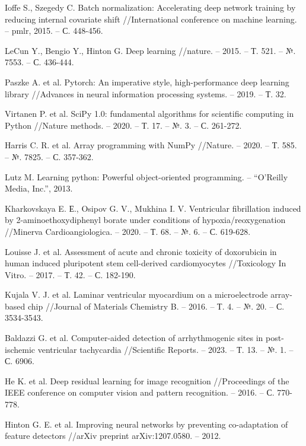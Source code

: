 \begin{thebibliography}{00}
	Ioffe S., Szegedy C. Batch normalization: Accelerating deep network
	training by reducing internal covariate shift //International conference on
	machine learning. – pmlr, 2015. – С. 448-456.

	LeCun Y., Bengio Y., Hinton G. Deep learning //nature. – 2015. – Т. 521. –
	№. 7553. – С. 436-444.

	Paszke A. et al. Pytorch: An imperative style, high-performance deep
	learning library //Advances in neural information processing systems. –
	2019. – Т. 32.

	Virtanen P. et al. SciPy 1.0: fundamental algorithms for scientific
	computing in Python //Nature methods. – 2020. – Т. 17. – №. 3. – С.
	261-272.

	Harris C. R. et al. Array programming with NumPy //Nature. – 2020. – Т.
	585. – №. 7825. – С. 357-362.

	Lutz M. Learning python: Powerful object-oriented programming. – ``O'Reilly
	Media, Inc.'', 2013.

	Kharkovskaya E. Е., Osipov G. V., Mukhina I. V. Ventricular fibrillation
	induced by 2-aminoethoxydiphenyl borate under conditions of
	hypoxia/reoxygenation //Minerva Cardioangiologica. – 2020. – Т. 68. – №. 6.
	– С. 619-628.

	Louisse J. et al. Assessment of acute and chronic toxicity of doxorubicin
	in human induced pluripotent stem cell-derived cardiomyocytes //Toxicology
	In Vitro. – 2017. – Т. 42. – С. 182-190.

	Kujala V. J. et al. Laminar ventricular myocardium on a microelectrode
	array-based chip //Journal of Materials Chemistry B. – 2016. – Т. 4. – №.
	20. – С. 3534-3543.

	Baldazzi G. et al. Computer-aided detection of arrhythmogenic sites in
	post-ischemic ventricular tachycardia //Scientific Reports. – 2023. – Т.
	13. – №. 1. – С. 6906.

	He K. et al. Deep residual learning for image recognition //Proceedings of
	the IEEE conference on computer vision and pattern recognition. – 2016. –
	С. 770-778.

	Hinton G. E. et al. Improving neural networks by preventing co-adaptation
	of feature detectors //arXiv preprint arXiv:1207.0580. – 2012.


\end{thebibliography}
